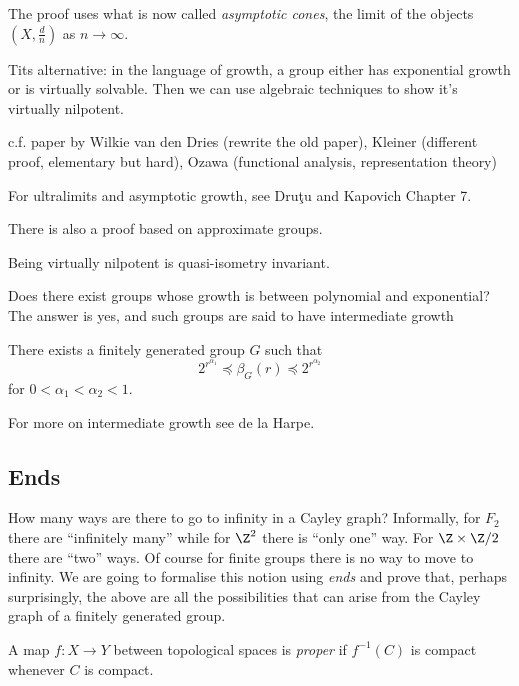 \documentclass[a4paper]{article}
\begin{document}
\begin{remark}
  The proof uses what is now called \emph{asymptotic cones}, the limit of the objects \((X, \frac{d}{n})\) as \(n \to \infty\).

  Tits alternative: in the language of growth, a group either has exponential growth or is virtually solvable. Then we can use algebraic techniques to show it's virtually nilpotent.

  c.f. paper by Wilkie van den Dries (rewrite the old paper), Kleiner (different proof, elementary but hard), Ozawa (functional analysis, representation theory)

  For ultralimits and asymptotic growth, see Druţu and Kapovich Chapter 7.

  There is also a proof based on approximate groups.
\end{remark}

\begin{corollary}
  Being virtually nilpotent is quasi-isometry invariant.
\end{corollary}

Does there exist groups whose growth is between polynomial and exponential? The answer is yes, and such groups are said to have intermediate growth

\begin{theorem}[Grigorchuk, 1983]
  There exists a finitely generated group \(G\) such that
  \[
    2^{r^{\alpha_1}} \preceq \beta_G(r) \preceq 2^{r^{\alpha_2}}
  \]
  for \(0 < \alpha_1 < \alpha_2 < 1\).
\end{theorem}

For more on intermediate growth see de la Harpe.

\subsection{Ends}

How many ways are there to go to infinity in a Cayley graph? Informally, for \(F_2\) there are ``infinitely many'' while for \(\Z^2\) there is ``only one'' way. For \(\Z \times \Z/2\) there are ``two'' ways. Of course for finite groups there is no way to move to infinity. We are going to formalise this notion using \emph{ends} and prove that, perhaps surprisingly, the above are all the possibilities that can arise from the Cayley graph of a finitely generated group.

\begin{definition}
  A map \(f: X \to Y\) between topological spaces is \emph{proper} if \(f^{-1}(C)\) is compact whenever \(C\) is compact.
\end{definition}
\end{document}
